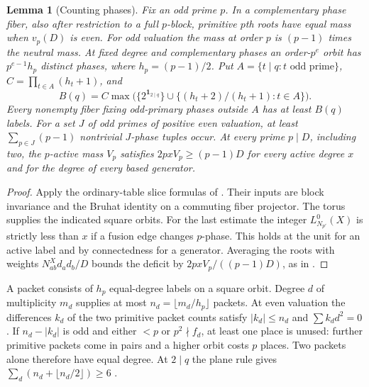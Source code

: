 \documentclass[11pt]{amsart}
\numberwithin{equation}{section}
\newtheorem{lemma}[theorem]{Lemma}
\theoremstyle{definition}
\theoremstyle{plain}
\begin{document}
\begin{lemma}[Counting phases]\label{block:packets}
Fix an odd prime $p$. In a complementary phase fiber, also after
restriction to a full $p$-block, primitive $p$th roots have equal
mass when $v_p(D)$ is even. For odd valuation the mass at order $p$ is
$(p-1)$ times the neutral mass. At fixed degree and complementary
phases an order-$p^e$ orbit has $p^{e-1}h_p$ distinct phases, where
$h_p=(p-1)/2$.
Put $A=\{t\mid q:t\text{ odd prime}\}$,
$C=\prod_{t\in A}(h_t+1)$, and
\[
 B(q)= C\max\bigl(\{2^{\mathbf1_{2\mid q}}\}
               \cup\{(h_t+2)/(h_t+1):t\in A\}\bigr).
\]
Every nonempty fiber fixing odd-primary phases outside $A$ has
at least $B(q)$ labels. For a set $J$ of odd primes of positive even
valuation, at least $\sum_{p\in J}(p-1)$ nontrivial $J$-phase tuples
occur. At every prime $p\mid D$, including two, the $p$-active mass $V_p$ satisfies
$2pxV_p\ge(p-1)D$ for every active degree $x$ and for the degree
of every based generator.
\end{lemma}
\begin{proof}
Apply the ordinary-table slice formulas of
\cite[Propositions~3.9, 19.1, 19.8 and \S19.2]{BDPcore}. Their
inputs are block invariance and the Bruhat identity on a commuting
fiber projector. The torus supplies the indicated square orbits. For
the last estimate the integer $L^0_{N_{p'}}(X)$ is strictly less
than $x$ if a fusion edge changes $p$-phase. This holds at the unit
for an active label and by connectedness for a generator. Averaging
the roots with weights $N_{ab}^X d_a d_b/D$ bounds the deficit by
$2pxV_p/((p-1)D)$, as in \cite[Proposition~3.8]{BDPcore}.
\end{proof}
A packet consists of $h_p$ equal-degree labels on a square orbit.
Degree $d$ of multiplicity $m_d$ supplies at most $n_d=\lfloor m_d/h_p\rfloor$
packets. At even valuation the differences $k_d$ of the two primitive
packet counts satisfy $|k_d|\le n_d$ and $\sum k_dd^2=0$. If
$n_d-|k_d|$ is odd and either $<p$ or $p^2\nmid f_d$, at least
one place is unused: further primitive packets come in pairs and
a higher orbit costs $p$ places. Two packets alone therefore have
equal degree. At $2\mid q$ the plane rule gives
$\sum_d(n_d+\lfloor n_d/2\rfloor)\ge6$
\cite[Lemma~19.6]{BDPcore}.
\end{document}
